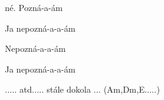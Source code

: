 \begin{song}
\bigskip

\begin{chorusbox}{\Refren}
né. Pozná-a-ám  \par
{} Ja nepozná-a-a-ám  \par
{} Nepozná-a-a-ám  \par
{} Ja nepozná-a-a-ám \par
\end{chorusbox}

\bigskip

..... atd..... stále dokola ... (Am,Dm,E.....) \par

\end{song}
